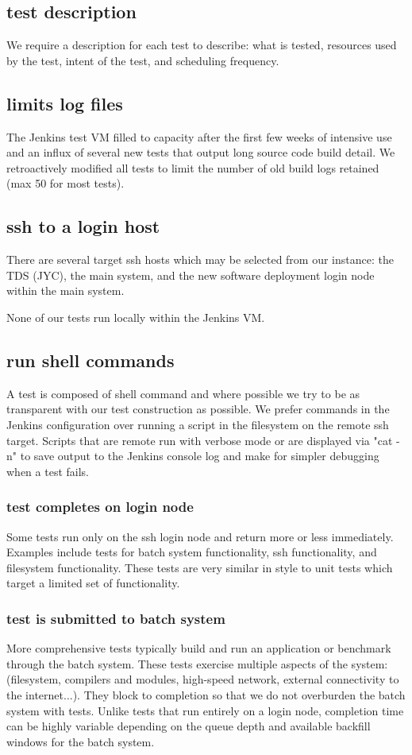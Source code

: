 \documentclass[10pt, conference, compsocconf]{IEEEtran}
\begin{document}
\subsection{test description}
We require a description for each test to describe: what is tested, resources used by the test, intent of the test, and scheduling frequency.
\subsection{limits log files}
The Jenkins test VM filled to capacity after the first few weeks of intensive use and an influx of several new tests that output long source code build detail. 
 We retroactively modified all tests to limit the number of old build logs retained (max 50 for most tests). 

\subsection{ssh to a login host}
There are several target ssh hosts which may be selected from our instance: the TDS (JYC), the main system, and the new software deployment login node within the main system. 

 None of our tests run locally within the Jenkins VM.
\subsection{run shell commands}
A test is composed of shell command and where possible we try to be as transparent with our test construction as possible. 
We prefer commands in the Jenkins configuration over running a script in the filesystem on the remote ssh target. 
Scripts that are remote run with verbose mode or are displayed via "cat -n" to save output to the Jenkins console log and make for simpler debugging when a test fails.
\subsubsection{test completes on login node}
Some tests run only on the ssh login node and return more or less immediately. 
 Examples include tests for batch system functionality, ssh functionality, and filesystem functionality. 
 These tests are very similar in style to unit tests which target a limited set of functionality.
\subsubsection{test is submitted to batch system}
More comprehensive tests typically build and run an application or benchmark through the batch system. 
 These tests exercise multiple aspects of the system: (filesystem, compilers and modules, high-speed network, external connectivity to the internet...). 
 They block to completion so that we do not overburden the batch system with tests. 
 Unlike tests that run entirely on a login node, completion time can be highly variable depending on the queue depth and available backfill windows for the batch system.
\end{document}
